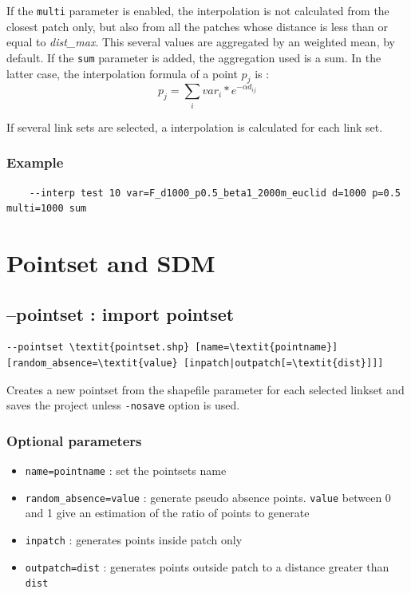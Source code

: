 \documentclass[a4paper,10pt]{report}
\begin{document}
If the \verb|multi| parameter is enabled, the interpolation is not calculated from the closest patch only, but also from all the patches whose distance is less than or equal to \textit{dist\_max}. This several values are aggregated by an weighted mean, by default. If the \verb|sum| parameter is added, the aggregation used is a sum. In the latter case, the interpolation formula of a point $p_j$ is :
$$p_j = \sum_i{var_i * e^{-\alpha d_{ij}}} $$

If several link sets are selected, a interpolation is calculated for each link set.

\subsubsection{Example}
\begin{Verbatim}
	--interp test 10 var=F_d1000_p0.5_beta1_2000m_euclid d=1000 p=0.5 multi=1000 sum
\end{Verbatim}


\section{Pointset and SDM}
\subsection{--pointset : import pointset}
\begin{Verbatim}[commandchars=\\\{\}]
--pointset \textit{pointset.shp} [name=\textit{pointname}] [random_absence=\textit{value} [inpatch|outpatch[=\textit{dist}]]]
\end{Verbatim}
Creates a new pointset from the shapefile parameter for each selected linkset and saves the project unless \verb|-nosave| option is used.

\subsubsection{Optional parameters}
\begin{itemize}
	\item \verb|name=pointname| : set the pointsets name
	\item \verb|random_absence=value| : generate pseudo absence points. \verb|value| between 0 and 1 give an estimation of the ratio of points to generate
	\item \verb|inpatch| : generates points inside patch only
	\item \verb|outpatch=dist| : generates points outside patch to a distance greater than \verb|dist|
\end{itemize}
\end{document}
